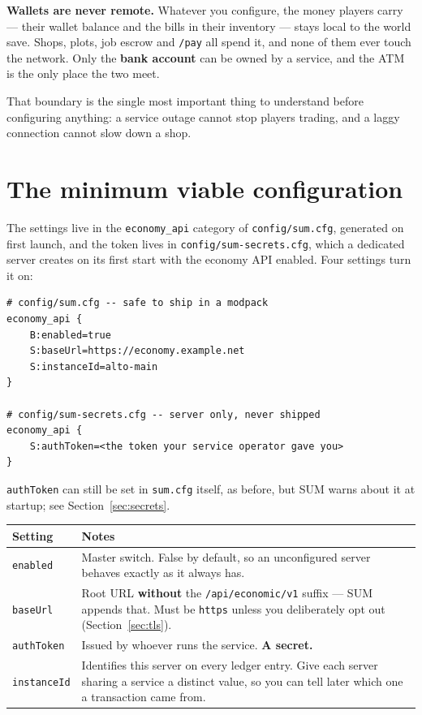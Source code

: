 \documentclass[11pt,a4paper]{article}
\newcommand{\code}[1]{\texttt{\small #1}}
\newcommand{\keybox}[2]{%
  \par\vspace{0.5em}\noindent
  \colorbox{#1}{\begin{minipage}{\dimexpr\linewidth-2\fboxsep\relax}
  \vspace{0.35em}\small #2\vspace{0.35em}\end{minipage}}\par\vspace{0.5em}}
\newcommand{\note}[1]{\keybox{omceWash}{#1}}
\begin{document}
\note{\textbf{Wallets are never remote.} Whatever you configure, the money players carry --- their
wallet balance and the bills in their inventory --- stays local to the world save. Shops, plots,
job escrow and \code{/pay} all spend it, and none of them ever touch the network. Only the
\textbf{bank account} can be owned by a service, and the ATM is the only place the two meet.}

That boundary is the single most important thing to understand before configuring anything: a
service outage cannot stop players trading, and a laggy connection cannot slow down a shop.

\section{The minimum viable configuration}

The settings live in the \code{economy\_api} category of \code{config/sum.cfg}, generated on
first launch, and the token lives in \code{config/sum-secrets.cfg}, which a dedicated server
creates on its first start with the economy API enabled. Four settings turn it on:

\begin{lstlisting}
# config/sum.cfg -- safe to ship in a modpack
economy_api {
    B:enabled=true
    S:baseUrl=https://economy.example.net
    S:instanceId=alto-main
}

# config/sum-secrets.cfg -- server only, never shipped
economy_api {
    S:authToken=<the token your service operator gave you>
}
\end{lstlisting}

\code{authToken} can still be set in \code{sum.cfg} itself, as before, but SUM warns about it at
startup; see Section~\ref{sec:secrets}.

\begin{tabularx}{\linewidth}{L{3.2cm} X}
\toprule
\textbf{Setting} & \textbf{Notes}\\
\midrule
\code{enabled}    & Master switch. False by default, so an unconfigured server behaves exactly as
                    it always has.\\
\code{baseUrl}    & Root URL \textbf{without} the \code{/api/economic/v1} suffix --- SUM appends
                    that. Must be \code{https} unless you deliberately opt out (Section~\ref{sec:tls}).\\
\code{authToken}  & Issued by whoever runs the service. \textbf{A secret.}\\
\code{instanceId} & Identifies this server on every ledger entry. Give each server sharing a
                    service a distinct value, so you can tell later which one a transaction came
                    from.\\
\bottomrule
\end{tabularx}
\end{document}
